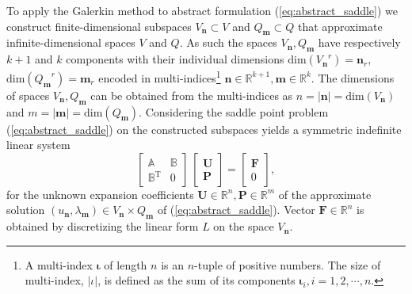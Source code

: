 \documentclass{marine_2015}
\newcommand{\Uvec}{\ensuremath{\mathbf{U}}}
\newcommand{\Pvec}{\ensuremath{\mathbf{P}}}
\newcommand{\Vh}{\ensuremath{V_{\mathbf{n}}}}
\newcommand{\Qh}{\ensuremath{Q_{\mathbf{m}}}}
\begin{document}
To apply the Galerkin method to abstract formulation (\ref{eq:abstract_saddle}) we 
construct finite-dimensional subspaces $\Vh\subset V$ and $\Qh\subset Q$ that 
approximate infinite-dimensional spaces $V$ and $Q$. As such the spaces $\Vh, \Qh$ have respectively 
$k+1$ and $k$ components with their individual dimensions
$\text{dim}\left(\Vh^r\right)=\mathbf{n}_r$, $\text{dim}\left(\Qh^r\right)=\mathbf{m}_r$ 
encoded in multi-indices\footnote{A multi-index $\mathbf{\iota}$ of length $n$
is an $n$-tuple of positive numbers. The size of multi-index, $|\iota|$, is defined as the
sum of its components $\mathbf{\iota}_i, i=1, 2, \cdots, n$.} $\mathbf{n}\in\mathbb{R}^{k+1}, \mathbf{m}\in\mathbb{R}^k$.
The dimensions of spaces $\Vh, \Qh$ can be obtained from the multi-indices as
$n=|\mathbf{n}|=\text{dim}\left(\Vh\right)$ and $m=|\mathbf{m}|=\text{dim}\left(\Qh\right)$. 
Considering the saddle point problem (\ref{eq:abstract_saddle}) on the constructed 
subspaces yields a symmetric indefinite linear system
\begin{equation}
  \label{eq:sysAB}
    \begin{bmatrix}
      \mathbb{A} & \mathbb{B} \\
      \mathbb{B}^{\text{T}} & 0
    \end{bmatrix}
    \,
    \begin{bmatrix}
      \mathbf{U} \\
      \mathbf{P}
    \end{bmatrix}
    =
    \begin{bmatrix}
      \mathbf{F}\\
      0
    \end{bmatrix},
\end{equation}
for the unknown expansion coefficients $\Uvec\in\mathbb{R}^n,
\Pvec\in\mathbb{R}^m$ of the approximate solution
$\left(u_\mathbf{n}, \lambda_{\mathbf{m}}\right)\in \Vh \times \Qh$ of
(\ref{eq:abstract_saddle}). Vector $\mathbf{F}\in\mathbb{R}^n$ is obtained by
discretizing the linear form $L$ on the space $\Vh$.
\end{document}
